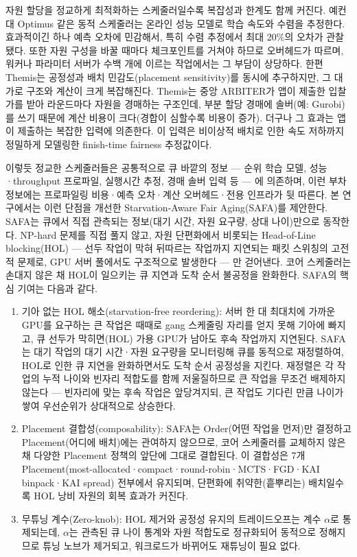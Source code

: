 \documentclass{ieeetj}
\begin{document}
자원 할당을 정교하게 최적화하는 스케줄러일수록 복잡성과 한계도 함께 커진다. 예컨대 Optimus\cite{peng2018optimus} 같은 동적 스케줄러는 온라인 성능 모델로 학습 속도와 수렴을 추정한다. 효과적이긴 하나 예측 오차에 민감해서, 특히 수렴 추정에서 최대 20\%의 오차가 관찰됐다. 또한 자원 구성을 바꿀 때마다 체크포인트를 거쳐야 하므로 오버헤드가 따르며, 워커나 파라미터 서버가 수백 개에 이르는 작업에서는 그 부담이 상당하다. 한편 Themis\cite{mahajan2020themis}는 공정성과 배치 민감도(placement sensitivity)를 동시에 추구하지만, 그 대가로 구조와 계산이 크게 복잡해진다. Themis는 중앙 ARBITER가 앱이 제출한 입찰가를 받아 라운드마다 자원을 경매하는 구조인데, 부분 할당 경매에 솔버(예: Gurobi)를 쓰기 때문에 계산 비용이 크다(경합이 심할수록 비용이 증가). 더구나 그 효과는 앱이 제출하는 복잡한 입력에 의존한다. 이 입력은 비이상적 배치로 인한 속도 저하까지 정밀하게 모델링한 finish-time fairness 추정값이다.

이렇듯 정교한 스케줄러들은 공통적으로 큐 바깥의 정보 --- 순위 학습 모델, 성능·throughput 프로파일, 실행시간 추정, 경매 솔버 입력 등 --- 에 의존하며, 이런 부차 정보에는 프로파일링 비용·예측 오차·계산 오버헤드·전용 인프라가 뒷 따른다. 본 연구에서는 이런 단점을 개선한 Starvation-Aware Fair Aging(SAFA)를 제안한다. SAFA는 큐에서 직접 관측되는 정보(대기 시간, 자원 요구량, 상대 나이)만으로 동작한다. NP-hard 문제를 직접 풀지 않고, 자원 단편화에서 비롯되는 Head-of-Line blocking(HOL)\cite{karol1987hol} --- 선두 작업이 막혀 뒤따르는 작업까지 지연되는 패킷 스위칭의 고전적 문제로, GPU 서버 풀에서도 구조적으로 발생한다 --- 만 걷어낸다. 코어 스케줄러는 손대지 않은 채 HOL이 일으키는 큐 지연과 도착 순서 불공정을 완화한다. SAFA의 핵심 기여는 다음과 같다.
\begin{enumerate}
\item 기아 없는 HOL 해소(starvation-free reordering): 서버 한 대 최대치에 가까운 GPU를 요구하는 큰 작업은 때때로 gang 스케줄링 자리를 얻지 못해 기아에 빠지고, 큐 선두가 막히면(HOL) 가용 GPU가 남아도 후속 작업까지 지연된다. SAFA는 대기 작업의 대기 시간·자원 요구량을 모니터링해 큐를 동적으로 재정렬하여, HOL로 인한 큐 지연을 완화하면서도 도착 순서 공정성을 지킨다. 재정렬은 각 작업의 누적 나이와 빈자리 적합도를 함께 저울질하므로 큰 작업을 무조건 배제하지 않는다 --- 빈자리에 맞는 후속 작업은 앞당겨지되, 큰 작업도 기다린 만큼 나이가 쌓여 우선순위가 상대적으로 상승한다.
\item Placement 결합성(composability): SAFA는 Order(어떤 작업을 먼저)만 결정하고 Placement(어디에 배치)에는 관여하지 않으므로, 코어 스케줄러를 교체하지 않은 채 다양한 Placement 정책의 앞단에 그대로 결합된다. 이 결합성은 7개 Placement(most-allocated·compact·round-robin·MCTS·FGD·KAI binpack·KAI spread) 전부에서 유지되며, 단편화에 취약한(흩뿌리는) 배치일수록 HOL 낭비 자원의 회복 효과가 커진다.
\item 무튜닝 계수(Zero-knob): HOL 제거와 공정성 유지의 트레이드오프는 계수 $\alpha$로 통제되는데, $\alpha$는 관측된 큐 나이 통계와 자원 적합도로 정규화되어 동적으로 정해지므로 튜닝 노브가 제거되고, 워크로드가 바뀌어도 재튜닝이 필요 없다.

\end{enumerate}
\end{document}
